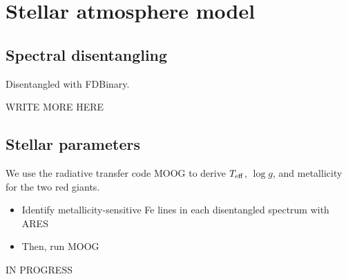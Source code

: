 \section{Stellar atmosphere model}\label{atm}

\subsection{Spectral disentangling}\label{disentangle}
Disentangled with FDBinary.

WRITE MORE HERE

\subsection{Stellar parameters}\label{parameters}
We use the radiative transfer code MOOG \citep{sne73} to derive $T_{\rm{eff}}$, $\log g$, and metallicity for the two red giants.
\begin{itemize}
\item Identify metallicity-sensitive Fe lines in each disentangled spectrum with ARES
\item Then, run MOOG
\end{itemize}

IN PROGRESS